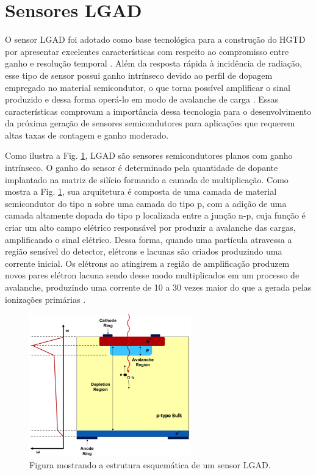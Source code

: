 \section{Sensores LGAD}

O sensor LGAD foi adotado como base tecnológica para a construção do HGTD por apresentar excelentes características com respeito ao compromisso entre ganho e resolução temporal \cite{tdr,JIN_LGAD,NIMA_LGAD,NIMA_LGAD_I,NIMA_LGAD_II,NIMA_LGAD_III}. Além da resposta rápida à incidência de radiação, esse tipo de sensor possui ganho intrínseco devido ao perfil de dopagem empregado no material semicondutor, o que torna possível amplificar o sinal produzido e dessa forma operá-lo em modo de avalanche de carga \cite{JIN_LGAD,NIMA_LGAD,NIMA_LGAD_I,NIMA_LGAD_II,NIMA_LGAD_III}. Essas características comprovam a importância dessa tecnologia para o desenvolvimento da próxima geração de sensores semicondutores para aplicações que requerem altas taxas de contagem e ganho moderado.
\thispagestyle{plain}

Como ilustra a Fig. \ref{lgad}, LGAD são sensores semicondutores planos com ganho intrínseco. O ganho do sensor é determinado pela quantidade de dopante implantado na matriz de silício formando a camada de multiplicação. Como mostra a Fig. \ref{lgad}, sua arquitetura é composta de uma camada de material semicondutor do tipo n sobre uma camada do tipo p, com a adição de uma camada altamente dopada do tipo p localizada entre a junção n-p, cuja função é criar um alto campo elétrico responsável por produzir a avalanche das cargas, amplificando o sinal elétrico. Dessa forma, quando uma partícula atravessa a região sensível do detector, elétrons e lacunas são criados produzindo uma corrente inicial. Os elétrons ao atingirem a região de amplificação produzem novos pares elétron lacuna sendo desse modo multiplicados em um processo de avalanche, produzindo uma corrente de 10 a 30 vezes maior do que a gerada pelas ionizações primárias \cite{JIN_LGAD,NIMA_LGAD_III}. 

\begin{figure}
    \centering
    \includegraphics[width=7.0cm]{assets/lgad.png}
    \caption{Figura mostrando a estrutura esquemática de um sensor LGAD.}
    \label{lgad}
\end{figure}
\thispagestyle{plain}

